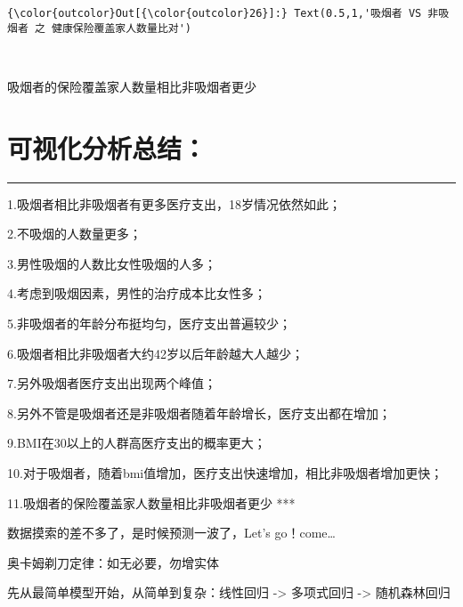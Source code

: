 \documentclass[11pt]{article}
\begin{document}
\begin{Verbatim}[commandchars=\\\{\}]
{\color{outcolor}Out[{\color{outcolor}26}]:} Text(0.5,1,'吸烟者 VS 非吸烟者 之 健康保险覆盖家人数量比对')
\end{Verbatim}
            
    \begin{center}
    \end{center}
    { \hspace*{\fill} \\}
    
    吸烟者的保险覆盖家人数量相比非吸烟者更少

    \hypertarget{ux53efux89c6ux5316ux5206ux6790ux603bux7ed3}{%
\section{可视化分析总结：}\label{ux53efux89c6ux5316ux5206ux6790ux603bux7ed3}}

\begin{center}\rule{0.5\linewidth}{\linethickness}\end{center}

1.吸烟者相比非吸烟者有更多医疗支出，18岁情况依然如此；

2.不吸烟的人数量更多；

3.男性吸烟的人数比女性吸烟的人多；

4.考虑到吸烟因素，男性的治疗成本比女性多；

5.非吸烟者的年龄分布挺均匀，医疗支出普遍较少；

6.吸烟者相比非吸烟者大约42岁以后年龄越大人越少；

7.另外吸烟者医疗支出出现两个峰值；

8.另外不管是吸烟者还是非吸烟者随着年龄增长，医疗支出都在增加；

9.BMI在30以上的人群高医疗支出的概率更大；

10.对于吸烟者，随着bmi值增加，医疗支出快速增加，相比非吸烟者增加更快；

11.吸烟者的保险覆盖家人数量相比非吸烟者更少 ***

    数据摸索的差不多了，是时候预测一波了，Let's go！come\ldots{}

奥卡姆剃刀定律：如无必要，勿增实体

先从最简单模型开始，从简单到复杂：线性回归 -\textgreater{} 多项式回归
-\textgreater{} 随机森林回归
\end{document}
